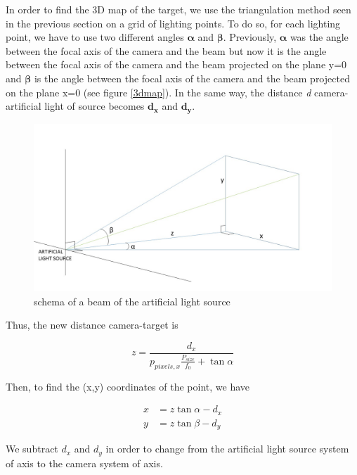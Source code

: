 In order to find the 3D map of the target, we use the triangulation method seen in the previous section on a grid of lighting points. To do so, for each lighting point, we have to use two different angles $\bm{\alpha}$ and $\bm{\beta}$. Previously, $\bm{\alpha}$ was the angle between the focal axis of the camera and the beam but now it is the angle between the focal axis of the camera and the beam projected on the plane y=0 and $\bm{\beta}$ is the angle between the focal axis of the camera and the beam projected on the plane x=0 (see figure \ref{3dmap}). In the same way, the distance \emph{d} camera-artificial light of source becomes $\bm{d_x}$ and $\bm{d_y}$.

\begin{figure}[H]
  \centerline{\includegraphics[scale=0.4]{fig/3dmap.jpg}}
  \caption{schema of a beam of the artificial light source}
  \label{fig:3dmap}
\end{figure}

Thus, the new distance camera-target is

\begin{equation}
z = \frac{d_x}{p_{pixels,x}\frac{P_{size}}{f_0}+ \tan \alpha}
\label{eq:formule3D}
\end{equation}

Then, to find the (x,y) coordinates of the point, we have

\begin{align}
x & = z \tan \alpha - d_x \\
y & = z \tan \beta - d_y
\end{align}

We subtract $d_x$ and $d_y$ in order to change from the artificial light source system of axis to the camera system of axis.